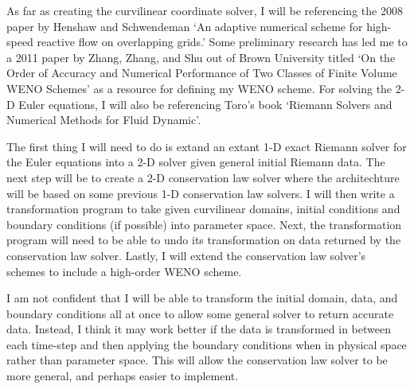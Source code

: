  As far as creating the curvilinear coordinate solver, I will be referencing the 2008 paper by Henshaw and Schwendeman `An adaptive numerical scheme for high-speed reactive flow on overlapping grids.' Some preliminary research has led me to a 2011 paper by Zhang, Zhang, and Shu out of Brown University titled `On the Order of Accuracy and Numerical Performance of Two Classes of Finite Volume WENO Schemes' as a resource for defining my WENO scheme. For solving the 2-D Euler equations, I will also be referencing Toro's book `Riemann Solvers and Numerical Methods for Fluid Dynamic'.\par

The first thing I will need to do is extand an extant 1-D exact Riemann solver for the Euler equations into  a 2-D solver given general initial Riemann data. The next step will be to create a 2-D conservation law solver where the architechture will be based on some previous 1-D conservation law solvers. I will then write a transformation program to take given curvilinear domains, initial conditions and boundary conditions (if possible) into parameter space. Next, the transformation program will need to be able to undo its transformation on data returned by the conservation law solver. Lastly, I will extend the conservation law solver's schemes to include a high-order WENO scheme.
\par
 I am not confident that I will be able to transform the initial domain, data, and boundary conditions all at once to allow some general solver to return accurate data. Instead, I think it may work better if the data is transformed in between each time-step and then applying the boundary conditions when in physical space rather than parameter space. This will allow the conservation law solver to be more general, and perhaps easier to implement.
 